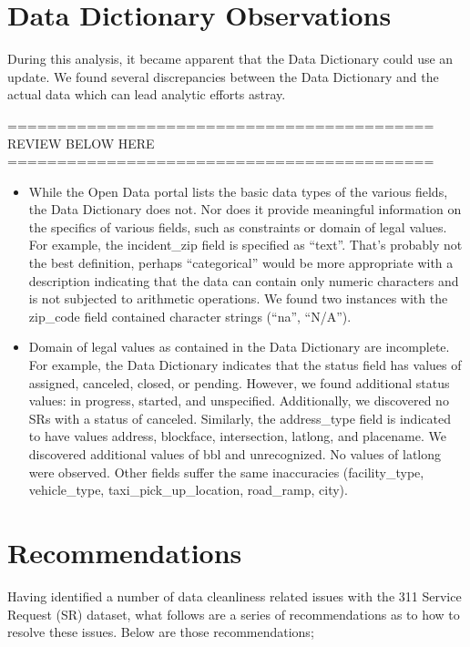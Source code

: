 \documentclass[12pt, titlepage]{article}
\begin{document}
\section{Data Dictionary Observations} 
\label{sec:datadictionay}
During this analysis, it became apparent that the  Data 
Dictionary could use an update. We found several discrepancies 
between the Data Dictionary and the actual data which can lead 
analytic efforts astray. 

===========================================
REVIEW BELOW HERE
===========================================

\begin{itemize}
	\item While the Open Data portal lists the basic data types of the 
	various fields, the Data Dictionary does not. Nor does it provide 
	meaningful information on the specifics of various fields, such 
	as constraints or domain of legal values. For example, the 
	incident\_zip field is specified as ``text''. That's probably not the 
	best definition, perhaps	``categorical'' would be more 
	appropriate with a description indicating that the data can 
	contain only numeric characters and is not subjected to arithmetic 
	operations. We found two instances with the zip\_code field 
	contained character strings (``na'', ``N/A''). 

	\item Domain of legal values as contained in the Data Dictionary 
	are incomplete. For example, the Data Dictionary indicates that 
	the status field has values of assigned, canceled, closed, or pending. 
	However, we found additional status values: in progress, started, 
	and unspecified. Additionally, we discovered no SRs with a status of 
	canceled. Similarly, the address\_type field is indicated to have 
	values address, blockface, intersection, latlong, and placename. We 
	discovered additional values of bbl and unrecognized. No values of 
	latlong were observed. Other fields suffer the same 	inaccuracies 
	(facility\_type, vehicle\_type, taxi\_pick\_up\_location, road\_ramp, city).
\end{itemize}



\section{Recommendations} 
\label{sec:recommendations}
Having identified a number of data cleanliness related issues with the 
311 Service Request (SR) dataset, what follows are a series of 
recommendations as to how to resolve these issues. Below are 
those recommendations;
\end{document}
